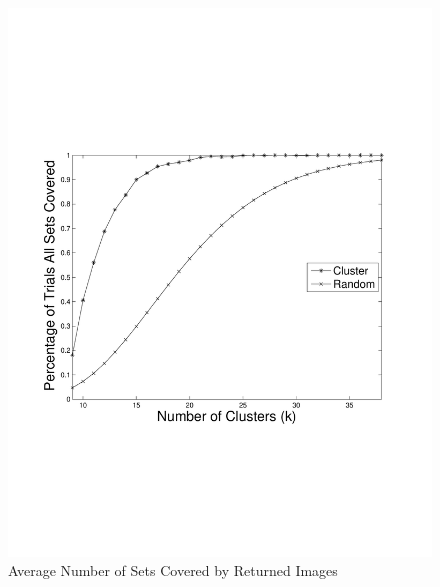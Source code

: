 \begin{figure} 
\begin{centering}
    \includegraphics[trim = 0mm 70mm 0mm 70mm, scale=0.40]{figures/cluster/perc_all_sets_covered_vary_k.pdf}
    \caption{Average Number of Sets Covered by Returned Images}
    \label{fig:spannerAvgNumSetsCov}
\end{centering}
\end{figure}

